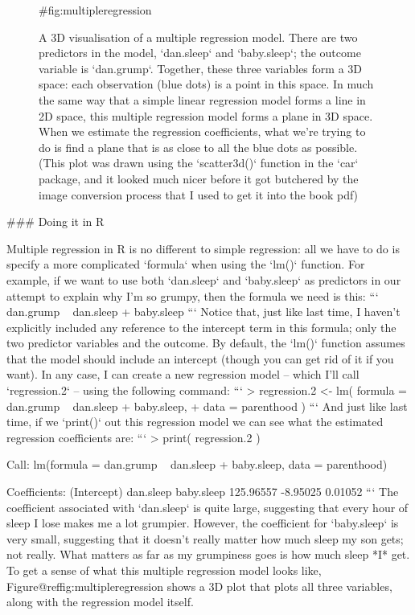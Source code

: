 \begin{figure}[p]
\begin{center}
\caption{A 3D visualisation of a multiple regression model. There are two predictors in the model, `dan.sleep` and `baby.sleep`; the outcome variable is `dan.grump`. Together, these three variables form a 3D space: each observation (blue dots) is a point in this space. In much the same way that a simple linear regression model forms a line in 2D space, this multiple regression model forms a plane in 3D space. When we estimate the regression coefficients, what we're trying to do is find a plane that is as close to all the blue dots as possible. (This plot was drawn using the `scatter3d()` function in the `car` package, and it looked much nicer before it got butchered by the image conversion process that I used to get it into the book pdf)}
{#fig:multipleregression}
\end{center}
\end{figure}

### Doing it in R 

Multiple regression in R is no different to simple regression: all we have to do is specify a more complicated `formula` when using the `lm()` function. For example, if we want to use both `dan.sleep` and `baby.sleep` as predictors in our attempt to explain why I'm so grumpy, then the formula we need is this:
```
                    dan.grump ~ dan.sleep + baby.sleep
```
Notice that, just like last time, I haven't explicitly included any reference to the intercept term in this formula; only the two predictor variables and the outcome. By default, the `lm()` function assumes that the model should include an intercept (though you can get rid of it if you want). In any case, I can create a new regression model -- which I'll call `regression.2` -- using the following command:
```
> regression.2 <- lm( formula = dan.grump ~ dan.sleep + baby.sleep,  
+                     data = parenthood )
```
And just like last time, if we `print()` out this regression model we can see what the estimated regression coefficients are:
```
> print( regression.2 )

Call:
lm(formula = dan.grump ~ dan.sleep + baby.sleep, data = parenthood)

Coefficients:
(Intercept)    dan.sleep   baby.sleep  
  125.96557     -8.95025      0.01052  
```
The coefficient associated with `dan.sleep` is quite large, suggesting that every hour of sleep I lose makes me a lot grumpier. However, the coefficient for `baby.sleep` is very small, suggesting that it doesn't really matter how much sleep my son gets; not really. What matters as far as my grumpiness goes is how much sleep *I* get. To get a sense of what this multiple regression model looks like, Figure@reffig:multipleregression shows a 3D plot that plots all three variables, along with the regression model itself. 

